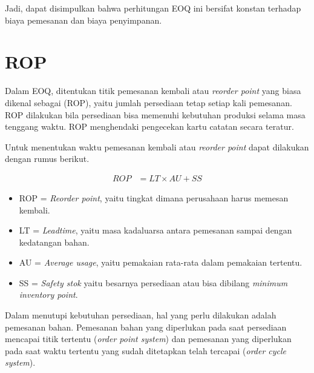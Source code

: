 Jadi, dapat disimpulkan bahwa perhitungan EOQ ini bersifat konstan terhadap biaya pemesanan dan biaya penyimpanan.

\section{ROP}

Dalam EOQ, ditentukan titik pemesanan kembali atau \textit{reorder point} yang biasa dikenal sebagai (ROP), yaitu jumlah persediaan tetap setiap kali pemesanan. ROP dilakukan bila persediaan bisa memenuhi kebutuhan produksi selama masa tenggang waktu. ROP menghendaki pengecekan kartu catatan secara teratur.

Untuk menentukan waktu pemesanan kembali atau \textit{reorder point} dapat dilakukan dengan rumus berikut.

\begin{equation}
    \begin{split}
		ROP
		&= LT \times AU + SS
    \end{split}
\end{equation}

\begin{itemize}
	\item ROP = \textit{Reorder point}, yaitu tingkat dimana perusahaan harus memesan kembali. 
	\item LT = \textit{Leadtime}, yaitu masa kadaluarsa antara pemesanan sampai dengan kedatangan bahan.
	\item AU = \textit{Average usage}, yaitu pemakaian rata-rata dalam pemakaian tertentu.
	\item SS = \textit{Safety stok} yaitu besarnya persediaan atau bisa dibilang \textit{minimum inventory point}.
\end{itemize}

Dalam menutupi kebutuhan persediaan, hal yang perlu dilakukan adalah pemesanan bahan. Pemesanan bahan yang diperlukan pada saat persediaan mencapai titik tertentu (\textit{order point system}) dan pemesanan yang diperlukan pada saat waktu tertentu yang sudah ditetapkan telah tercapai (\textit{order cycle system}).

